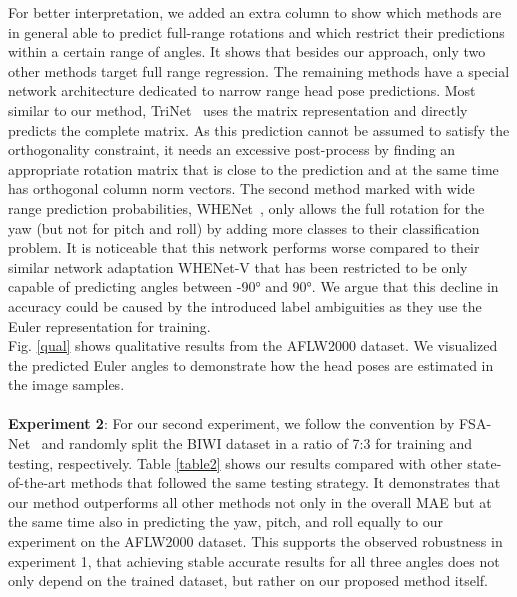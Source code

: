 \documentclass{article}
\begin{document}
For better interpretation, we added an extra column to show which methods are in general able to predict full-range rotations and which restrict their predictions within a certain range of angles. It shows that besides our approach, only two other methods target full range regression. The remaining methods have a special network architecture dedicated to narrow range head pose predictions. Most similar to our method, TriNet~\cite{Cao_2021_WACV} uses the matrix representation and directly predicts the complete matrix. As this prediction cannot be assumed to satisfy the orthogonality constraint, it needs an excessive post-process by finding an appropriate rotation matrix that is close to the prediction and at the same time has orthogonal column norm vectors. The second method marked with wide range prediction probabilities, WHENet~\cite{Zhou2020WHENetRF}, only allows the full rotation for the yaw (but not for pitch and roll) by adding more classes to their classification problem. It is noticeable that this network performs worse compared to their similar network adaptation WHENet-V that has been restricted to be only capable of predicting angles between -90° and 90°. We argue that this decline in accuracy could be caused by the introduced label ambiguities as they use the Euler representation for training. 
\\
Fig. \ref{qual} shows qualitative results from the AFLW2000 dataset. We visualized the predicted Euler angles to demonstrate how the head poses are estimated in the image samples.
\\
\\
\textbf{Experiment 2}: For our second experiment, we follow the convention by FSA-Net~\cite{Yang_2019_CVPR} and randomly split the BIWI dataset in a ratio of 7:3 for training and testing, respectively. Table \ref{table2} shows our results compared with other state-of-the-art methods that followed the same testing strategy. It demonstrates that our method outperforms all other methods not only in the overall MAE but at the same time also in predicting the yaw, pitch, and roll equally to our experiment on the AFLW2000 dataset. This supports the observed robustness in experiment 1, that achieving stable accurate results for all three angles does not only depend on the trained dataset, but rather on our proposed method itself. 
\\
\end{document}
